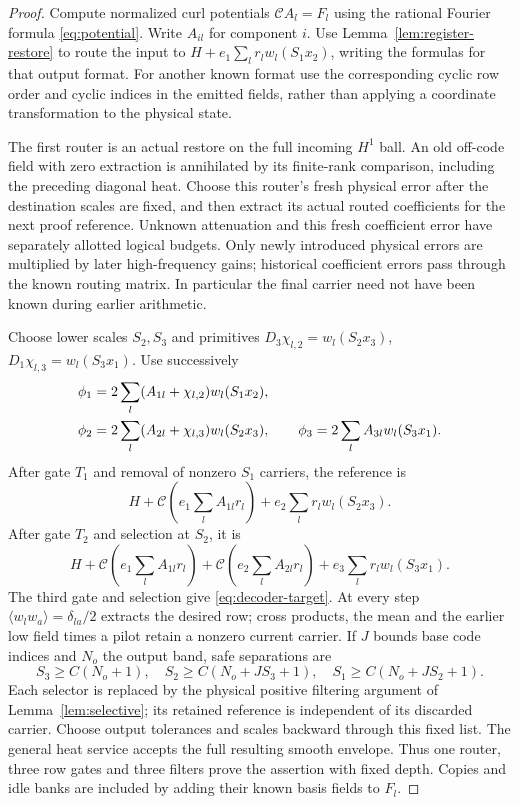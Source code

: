 \documentclass[11pt,a4paper]{amsart}
\theoremstyle{definition}
\theoremstyle{remark}
\numberwithin{equation}{section}
\begin{document}
\begin{proof}
Compute normalized curl potentials $\mathscr CA_l=F_l$ using the rational
Fourier formula \eqref{eq:potential}.  Write $A_{il}$ for component $i$.
Use Lemma~\ref{lem:register-restore} to route the input to
$H+e_1\sum_lr_lw_l(S_1x_2)$, writing the formulas for that output format.
For another known format use the corresponding cyclic row order and
cyclic indices in the emitted fields, rather than applying a coordinate
transformation to the physical state.

The first router is an actual restore on the full incoming $H^1$ ball.
An old off-code field with zero extraction is annihilated by its finite-rank
comparison, including the preceding diagonal heat. Choose this router's
fresh physical error after the destination scales are fixed, and then
extract its actual routed coefficients for the next proof reference.
Unknown attenuation and this fresh coefficient error have separately
allotted logical budgets. Only newly introduced physical errors are
multiplied by later high-frequency gains; historical coefficient errors
pass through the known routing matrix. In particular the final carrier
need not have been known during earlier arithmetic.

Choose lower scales $S_2,S_3$ and primitives
$D_3\chi_{l,2}=w_l(S_2x_3)$,
$D_1\chi_{l,3}=w_l(S_3x_1)$.  Use successively
\begin{align}\label{eq:decoder-scalars}
 \phi_1&=2\sum_l(A_{1l}+\chi_{l,2})w_l(S_1x_2),\notag\\
 \phi_2&=2\sum_l(A_{2l}+\chi_{l,3})w_l(S_2x_3),\qquad
 \phi_3=2\sum_lA_{3l}w_l(S_3x_1).
\end{align}
After gate $T_1$ and removal of nonzero $S_1$ carriers, the reference is
\[
 H+\mathscr C\left(e_1\sum_lA_{1l}r_l\right)
                 +e_2\sum_lr_lw_l(S_2x_3).
\]
After gate $T_2$ and selection at $S_2$, it is
\[
 H+\mathscr C\left(e_1\sum_lA_{1l}r_l\right)
  +\mathscr C\left(e_2\sum_lA_{2l}r_l\right)
                 +e_3\sum_lr_lw_l(S_3x_1).
\]
The third gate and selection give \eqref{eq:decoder-target}.  At every
step $\langle w_lw_a\rangle=\delta_{la}/2$ extracts the desired row;
cross products, the mean and the earlier low field times a pilot retain
a nonzero current carrier.  If $J$ bounds base code indices and $N_o$
the output band, safe separations are
\[
 S_3\ge C(N_o+1),\quad S_2\ge C(N_o+JS_3+1),\quad
 S_1\ge C(N_o+JS_2+1).
\]
Each selector is replaced by the physical positive filtering argument of
Lemma~\ref{lem:selective}; its retained reference is independent of its
discarded carrier.  Choose output tolerances and scales backward through
this fixed list.  The general heat service accepts the full resulting
smooth envelope.  Thus one router, three row gates and three filters
prove the assertion with fixed depth.  Copies and idle banks are included
by adding their known basis fields to $F_l$.
\end{proof}
\end{document}
